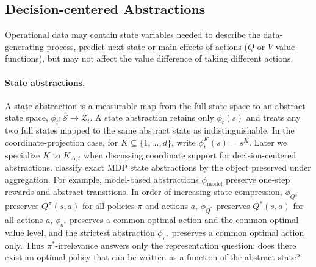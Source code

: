 \documentclass[opre,nonblindrev]{informs4}
\newenvironment{revision}{\begingroup\color{revisionblue}\ignorespaces}{\endgroup}
\begin{document}
\begin{revision}
\subsection{Decision-centered Abstractions}


Operational data may contain state variables needed to describe the
data-generating process, predict next state or main-effects of actions ($Q$ or $V$ value functions), but may not affect the value difference of taking different actions. 






\paragraph{State abstractions.}
A state abstraction is a measurable map from the full state space to an
abstract state space, $\phi_t:\mathcal S\to\mathcal Z_t$.
A state abstraction retains only \(\phi_t(s)\) and treats any two full
states mapped to the same abstract state as indistinguishable. In the
coordinate-projection case,
for \(K\subseteq\{1,\ldots,d\}\), write $
    \phi_t^K(s)=s^K$.
Later we specialize \(K\) to
\(K_{\Delta,t}\) when discussing coordinate support for decision-centered abstractions. \citet{li2006towards} classify exact MDP state abstractions by the object
preserved under aggregation. For example, model-based abstractions $\phi_{\mathrm{model}}$ preserve one-step rewards and abstract transitions. In order of increasing state compression, $\phi_{Q^\pi}$ preserves $Q^\pi(s,a)$ for all policies $\pi$ and actions $a$, $\phi_{Q^*}$ preserves $Q^*(s,a)$ for all actions $a$, $\phi_{a^*}$ preserves a common optimal action and the common optimal value level, and the strictest abstraction $\phi_{\pi^*}$ preserves a common optimal action only.
Thus \(\pi^*\)-irrelevance answers only the representation question:
does there exist an optimal policy that can be written as a function of the
abstract state? 


\end{revision}
\end{document}
